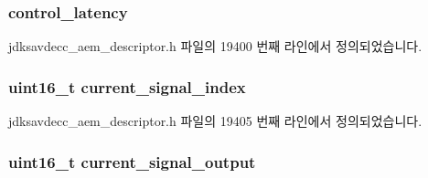 \subsubsection[{\texorpdfstring{control\+\_\+latency}{control_latency}}]{ control\+\_\+latency}\hypertarget{structjdksavdecc__descriptor__signal__selector_ab2bd4639caaf9a8078b68368afbd63b6}{}\label{structjdksavdecc__descriptor__signal__selector_ab2bd4639caaf9a8078b68368afbd63b6}


jdksavdecc\+\_\+aem\+\_\+descriptor.\+h 파일의 19400 번째 라인에서 정의되었습니다.

\subsubsection[{\texorpdfstring{current\+\_\+signal\+\_\+index}{current_signal_index}}]{\setlength{\rightskip}{0pt plus 5cm}uint16\+\_\+t current\+\_\+signal\+\_\+index}\hypertarget{structjdksavdecc__descriptor__signal__selector_a4212c1f7128d45c03128f227a8c006ea}{}\label{structjdksavdecc__descriptor__signal__selector_a4212c1f7128d45c03128f227a8c006ea}


jdksavdecc\+\_\+aem\+\_\+descriptor.\+h 파일의 19405 번째 라인에서 정의되었습니다.

\subsubsection[{\texorpdfstring{current\+\_\+signal\+\_\+output}{current_signal_output}}]{\setlength{\rightskip}{0pt plus 5cm}uint16\+\_\+t current\+\_\+signal\+\_\+output}\hypertarget{structjdksavdecc__descriptor__signal__selector_a5dc47fe67773594e0c97e7002f30dcdf}{}\label{structjdksavdecc__descriptor__signal__selector_a5dc47fe67773594e0c97e7002f30dcdf}


